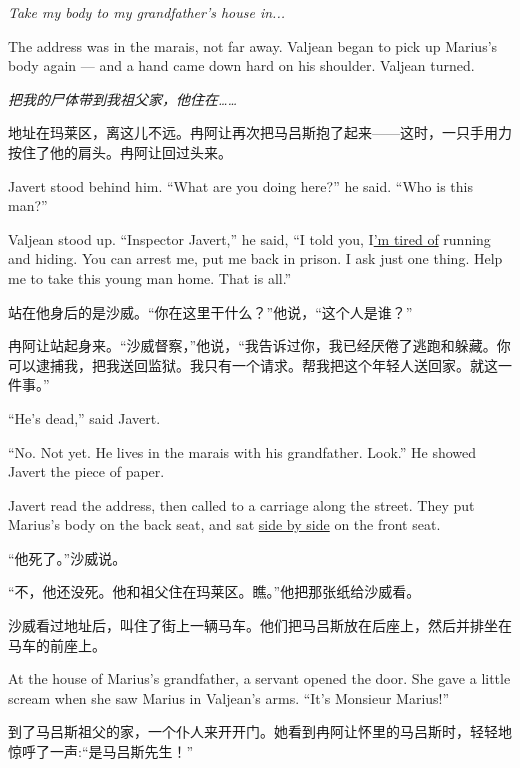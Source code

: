 \documentclass[fontset=ubuntu, zihao=5]{ctexart}
\begin{document}
\begin{paracol}{2}
\switchcolumn*

\emph{Take my body to my grandfather's house in...}

The address was in the marais, not far away. Valjean began to pick up Marius's body again --- and a hand came down hard on his shoulder. Valjean turned.

\switchcolumn

\emph{把我的尸体带到我祖父家，他住在……}

地址在玛莱区，离这儿不远。冉阿让再次把马吕斯抱了起来——这时，一只手用力按住了他的肩头。冉阿让回过头来。

\switchcolumn*

Javert stood behind him. ``What are you doing here?'' he said. ``Who is this man?''

Valjean stood up. ``Inspector Javert,'' he said, ``I told you, I\uline{'m tired
  of} running and hiding. You can arrest me, put me back in prison. I ask just
one thing. Help me to take this young man home. That is all.''


\switchcolumn

站在他身后的是沙威。“你在这里干什么？”他说，“这个人是谁？”

冉阿让站起身来。“沙威督察，”他说，“我告诉过你，我已经厌倦了逃跑和躲藏。你可以逮捕我，把我送回监狱。我只有一个请求。帮我把这个年轻人送回家。就这一件事。”

\switchcolumn*

``He's dead,'' said Javert.

``No. Not yet. He lives in the marais with his grandfather. Look.'' He showed Javert the piece of paper.

Javert read the address, then called to a carriage along the street. They put Marius's body on the back seat, and sat \uline{side by side} on the front seat.

\switchcolumn

“他死了。”沙威说。

“不，他还没死。他和祖父住在玛莱区。瞧。”他把那张纸给沙威看。

沙威看过地址后，叫住了街上一辆马车。他们把马吕斯放在后座上，然后并排坐在马车的前座上。

\switchcolumn*

At the house of Marius's grandfather, a servant opened the door. She gave a little scream when she saw Marius in Valjean's arms. ``It's Monsieur Marius!''

\switchcolumn

到了马吕斯祖父的家，一个仆人来开开门。她看到冉阿让怀里的马吕斯时，轻轻地惊呼了一声:“是马吕斯先生！”


\end{paracol}
\end{document}
